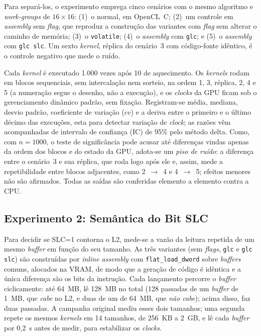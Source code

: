 \documentclass[12pt]{article}
\begin{document}
Para separá-los, o experimento emprega cinco cenários com o mesmo algoritmo e \textit{work-groups} de $16\times16$: (1)~o normal, em OpenCL~C; (2)~um controle em \textit{assembly} sem \textit{flag}, que reproduz a construção das variantes com \textit{flag} sem alterar o caminho de memória; (3)~o \texttt{volatile}; (4)~o \textit{assembly} com \texttt{glc}; e (5)~o \textit{assembly} com \texttt{glc slc}. Um sexto \textit{kernel}, réplica do cenário~3 com código-fonte idêntico, é o controle negativo que mede o ruído.

Cada \textit{kernel} é executado 1.000 vezes após 10 de aquecimento. Os \textit{kernels} rodam em blocos sequenciais, sem intercalação nem sorteio, na ordem 1, 3, réplica, 2, 4 e 5 (a numeração segue o desenho, não a execução), e os \textit{clocks} da GPU ficam sob o gerenciamento dinâmico padrão, sem fixação. Registram-se média, mediana, desvio padrão, coeficiente de variação ($cv$) e a deriva entre o primeiro e o último décimo das execuções, esta para detectar variação de \textit{clock}; as razões vêm acompanhadas de intervalo de confiança (IC) de 95\% pelo método delta. Como, com $n=1000$, o teste de significância pode acusar até diferenças vindas apenas da ordem dos blocos e do estado da GPU, adota-se um \emph{piso de ruído}: a diferença entre o cenário~3 e sua réplica, que roda logo após ele e, assim, mede a repetibilidade entre blocos adjacentes, como 2~$\to$~4 e 4~$\to$~5; efeitos menores não são afirmados. Todas as saídas são conferidas elemento a elemento contra a CPU.

\subsection{Experimento 2: Semântica do Bit SLC}
\label{sec:met-slc}

Para decidir se SLC=1 contorna o L2, mede-se a vazão da leitura repetida de um mesmo \textit{buffer} em função do seu tamanho. As três variantes (sem \textit{flags}, \texttt{glc} e \texttt{glc slc}) são construídas por \textit{inline assembly} com \texttt{flat\_load\_dword} sobre \textit{buffers} comuns, alocados na VRAM, de modo que a geração de código é idêntica e a única diferença são os bits da instrução. Cada lançamento percorre o \textit{buffer} ciclicamente: até 64~MB, lê 128~MB no total (128 passadas de um \textit{buffer} de 1~MB, que \emph{cabe} no L2, e duas de um de 64~MB, que \emph{não cabe}); acima disso, faz duas passadas. A campanha original mediu esses dois tamanhos; uma segunda repete os mesmos \textit{kernels} em 14 tamanhos, de 256~KB a 2~GB, e lê cada \textit{buffer} por 0,2~s antes de medir, para estabilizar os \textit{clocks}.
\end{document}
